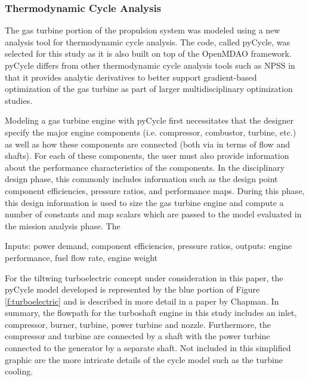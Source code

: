 \subsubsection{Thermodynamic Cycle Analysis} %
The gas turbine portion of the propulsion system was modeled using a new analysis tool for thermodynamic cycle analysis.
The code, called pyCycle\cite{gray2017chemical,hearn2016optimization}, was selected for this study as it is also built on top of the OpenMDAO framework.
pyCycle differs from other thermodynamic cycle analysis tools such as NPSS in that it provides analytic derivatives to better support gradient-based optimization of the gas turbine as part of larger multidisciplinary optimization studies.


Modeling a gas turbine engine with pyCycle first necessitates that the designer specify the major engine components (i.e. compressor, combustor, turbine, etc.) as well as how these components are connected (both via in terms of flow and shafts).
For each of these components, the user must also provide information about the performance characteristics of the components.
In the disciplinary design phase, this commonly includes information such as the design point component efficiencies, pressure ratios, and performance maps.
During this phase, this design information is used to size the gas turbine engine and compute a number of constants and map scalars which are passed to the model evaluated in the mission analysis phase.
The


Inputs: power demand, component efficiencies, pressure ratios, 
outputs: engine performance, fuel flow rate, engine weight


For the tiltwing turboelectric concept under consideration in this paper, the pyCycle model developed is represented by the blue portion of Figure \ref{f:turboelectric} and is described in more detail in a paper by Chapman.\cite{chapman2018multi}
In summary, the flowpath for the turboshaft engine in this study includes an inlet, compressor, burner, turbine, power turbine and nozzle. 
Furthermore, the compressor and turbine are connected by a shaft with the power turbine connected to the generator by a separate shaft. 
Not included in this simplified graphic are the more intricate details of the cycle model such as the turbine cooling.





